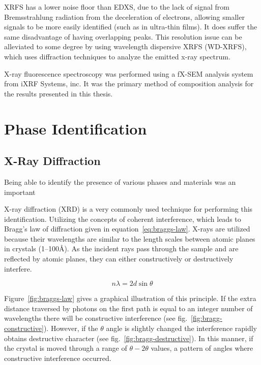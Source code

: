 XRFS has a lower noise floor than EDXS, due to the lack of signal from Bremsstrahlung radiation from the deceleration of electrons, allowing smaller signals to be more easily identified (such as in ultra-thin films). It does suffer the same disadvantage of having overlapping peaks. This resolution issue can be alleviated to some degree by using wavelength dispersive XRFS (WD-XRFS), which uses diffraction techniques to analyze the emitted x-ray spectrum. 

X-ray fluorescence spectroscopy was performed using a fX-SEM analysis system from iXRF Systems, inc.\cite{iXRF-web}  It was the primary method of composition analysis for the results presented in this thesis.



	
\section{Phase Identification}
\label{sec:Charact-PhaseID}


\subsection{X-Ray Diffraction}

Being able to identify the presence of various phases and materials was an important 

X-ray diffraction (XRD) is a very commonly used technique for performing this identification. Utilizing the concepts of coherent interference, which leads to Bragg's law of diffraction given in equation~\vref{eq:braggs-law}. X-rays are utilized because their wavelengths are similar to the length scales between atomic planes in crystals (1--100\AA). As the incident rays pass through the sample and are reflected by atomic planes, they can either constructively or destructively interfere. 

\begin{equation}
 \label{eq:braggs-law}
 \displaystyle
	n\lambda = 2d\sin\theta
\end{equation}

Figure~\vref{fig:braggs-law} gives a graphical illustration of this principle. If the extra distance traversed by photons on the first path is equal to an integer number of wavelengths there will be constructive interference (see fig.~\vref{fig:bragg-constructive}). However, if the $\theta$ angle is slightly changed the interference rapidly obtains destructive character (see fig.~\vref{fig:bragg-destructive}). In this manner, if the crystal is moved through a range of $\theta-2\theta$ values, a pattern of angles where constructive interference occurred. 


